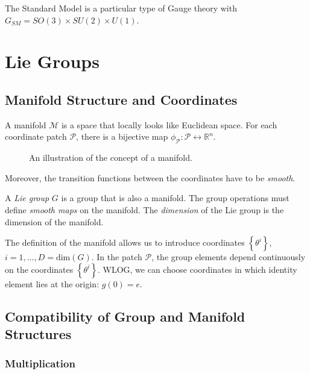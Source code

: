 The Standard Model is a particular type of Gauge theory with $G_{SM} = SO(3) \times SU(2) \times U(1)$.

\chapter{Lie Groups}%
\label{cha:lie_groups}

\section{Manifold Structure and Coordinates}%
\label{sec:definitions}

\begin{definition}[Manifold]
  A manifold $\mathcal{M}$ is a space that locally looks like Euclidean space. For each coordinate patch $\mathcal{P}$, there is a bijective map $\phi_\mathcal{P}: \mathcal{P} \leftrightarrow \mathbb{R}^n$. 
  \begin{figure}[htbp]
    \centering
    \def\svgwidth{0.6\columnwidth}
    
    \caption{An illustration of the concept of a manifold.}
    \label{fig:manifold}
  \end{figure}
  Moreover, the transition functions between the coordinates have to be \emph{smooth}.
\end{definition}

\begin{definition}
  A \emph{Lie group} $G$ is a group that is also a manifold. The group operations must define \emph{smooth maps} on the manifold.
  The \emph{dimension} of the Lie group is the dimension of the manifold.
\end{definition}

The definition of the manifold allows us to introduce coordinates $\left\{ \theta^i \right\}$, $i = 1, \dots, D = \text{dim}(G)$.
In the patch $\mathcal{P}$, the group elements depend continuously on the coordinates $\left\{ \theta^i \right\}$.
WLOG, we can choose coordinates in which identity element lies at the origin: $g(0) = e$.

\section{Compatibility of Group and Manifold Structures}%

\subsection{Multiplication}%
\label{sub:multiplication}

